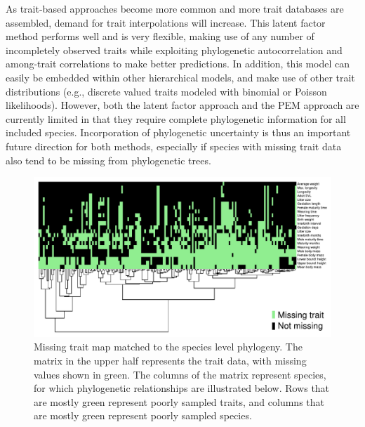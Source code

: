 As trait-based approaches become more common and more trait databases are assembled, demand for trait interpolations will increase.
This latent factor method performs well and is very flexible, making use of any number of incompletely observed traits while exploiting phylogenetic autocorrelation and among-trait correlations to make better predictions.
In addition, this model can easily be embedded within other hierarchical models, and make use of other trait distributions (e.g., discrete valued traits modeled with binomial or Poisson likelihoods).
However, both the latent factor approach and the PEM approach are currently limited in that they require complete phylogenetic information for all included species.
Incorporation of phylogenetic uncertainty is thus an important future direction for both methods, especially if species with missing trait data also tend to be missing from phylogenetic trees.

\begin{figure}[ht]\centering
\includegraphics[width=\linewidth]{figs/ch5/missingness.pdf}
\caption[Missing trait map matched to the species level phylogeny]{Missing trait map matched to the species level phylogeny. The matrix in the upper half represents the trait data, with missing values shown in green. The columns of the matrix represent species, for which phylogenetic relationships are illustrated below. Rows that are mostly green represent poorly sampled traits, and columns that are mostly green represent poorly sampled species.}
\label{fig:missingness}
\end{figure}

